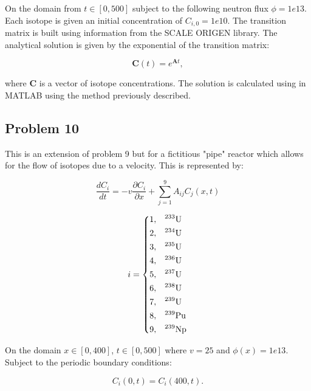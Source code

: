 \noindent On the domain from $t \in [0, 500]$ subject to the following neutron flux $\phi = 1e13$. Each isotope is given an initial concentration of $C_{i, 0} = 1e10$. The transition matrix is built using information from the SCALE ORIGEN library. The analytical solution is given by the exponential of the transition matrix:

\begin{equation}
   \boldsymbol{C}(t) = e^{\boldsymbol{A}t}, 
\end{equation}

\noindent where $\boldsymbol{C}$ is a vector of isotope concentrations. The solution is calculated using in MATLAB using the method previously described. 


\subsection{Problem 10}
This is an extension of problem 9 but for a fictitious "pipe" reactor which allows for the flow of isotopes due to a velocity. This is represented by:

\begin{equation}
\frac{d C_i}{dt} = -v\frac{\partial C_{i}}{\partial x} + \sum^9_{j = 1} A_{ij} C_j (x, t)
\end{equation}

\begin{equation}
i = \begin{dcases}
  1 , & \text{$^{233}$U}  \\
  2 , & \text{$^{234}$U}  \\
  3 , & \text{$^{235}$U}  \\
  4 , & \text{$^{236}$U}  \\
  5 , & \text{$^{237}$U}  \\
  6 , & \text{$^{238}$U}  \\
  7 , & \text{$^{239}$U}  \\
  8 , & \text{$^{239}$Pu} \\
  9 , & \text{$^{239}$Np} \\
\end{dcases}
\end{equation}

\noindent On the domain $x \in [0, 400]$, $t \in [0, 500]$ where $v = 25$ and $\phi(x) = 1e13$. Subject to the periodic boundary conditions:

\begin{equation}
    C_{i}(0,t) = C_{i}(400,t).
\end{equation}

